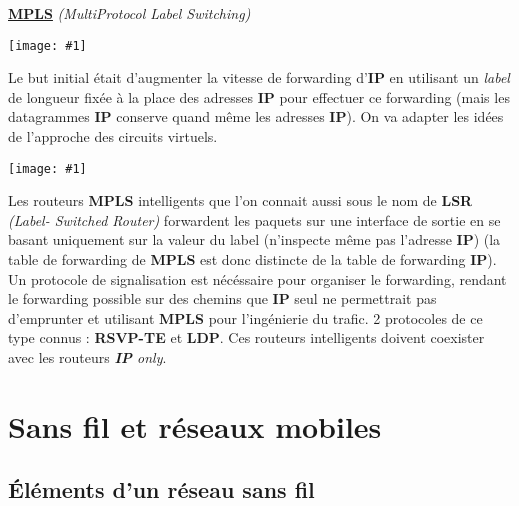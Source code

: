 \documentclass{article}
\newcommand{\imgR}[2]{\begin{center}\texttt{[image: \#1]}\end{center}}
\newcommand{\stitreD}[2]{\noindent\textbf{\underline{#1}} \textit{(#2)}\\}
\begin{document}
\stitreD{MPLS}{MultiProtocol Label Switching}

\imgR{CN_136.png}{225}

Le but initial était d'augmenter la vitesse de forwarding d'\textbf{IP} en utilisant un \textit{label} de 
longueur fixée à la place des adresses \textbf{IP} pour effectuer ce forwarding (mais les datagrammes \textbf{IP} 
conserve quand même les adresses \textbf{IP}). On va adapter les idées de l'approche des circuits virtuels.

\begin{multicols}{2}
\imgR{CN_137.png}{225}
Les routeurs \textbf{MPLS} intelligents que l'on connait aussi sous le nom de \textbf{LSR} \textit{(Label-
Switched Router)} forwardent les paquets sur une interface de sortie en se basant uniquement sur la valeur du 
label (n'inspecte même pas l'adresse \textbf{IP}) (la table de forwarding de \textbf{MPLS} est donc distincte de 
la table de forwarding \textbf{IP}). Un protocole de signalisation est nécéssaire pour organiser le forwarding, 
rendant le forwarding possible sur des chemins que \textbf{IP} seul ne permettrait pas d'emprunter et utilisant 
\textbf{MPLS} pour l'ingénierie du trafic. 2 protocoles de ce type connus : \textbf{RSVP-TE} et \textbf{LDP}. 
Ces routeurs intelligents doivent coexister avec les routeurs \textit{\textbf{IP} only}. \\
\end{multicols}

\hbox{\raisebox{0.4em}{\vrule depth 0.4pt height 0.4pt width 10cm}}

\section{Sans fil et réseaux mobiles}

\subsection{\'{E}léments d'un réseau sans fil}
\end{document}
